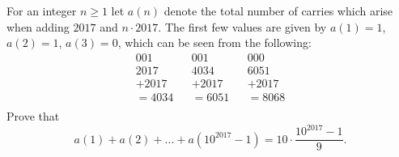 For an integer $n\geq 1$ let $a(n)$ denote the total number of carries which arise when adding $2017$ and $n\cdot 2017$. The first few values are given by $a(1)=1$,  $a(2)=1$,  $a(3)=0$,  which can be seen from the following:\begin{align*}

001  &&001 && 000 \\

2017 &&4034 &&6051 \\

+2017 &&+2017 &&+2017\\

=4034 &&=6051 &&=8068\\

\end{align*}Prove that$$a(1)+a(2)+...+a(10^{2017}-1)=10\cdot\frac{10^{2017}-1}{9}.$$